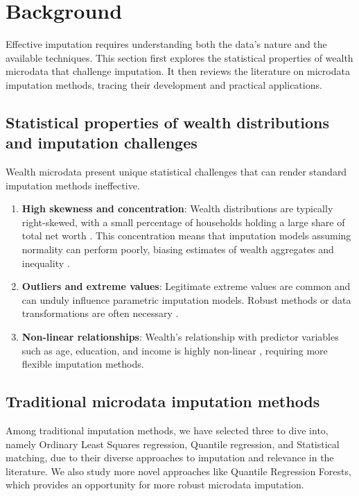\section{Background}

Effective imputation requires understanding both the data's nature and the available techniques. This section first explores the statistical properties of wealth microdata that challenge imputation. It then reviews the literature on microdata imputation methods, tracing their development and practical applications.

\subsection{Statistical properties of wealth distributions and imputation challenges}

Wealth microdata present unique statistical challenges that can render standard imputation methods ineffective.

\begin{enumerate}
    \item \textbf{High skewness and concentration}: Wealth distributions are typically right-skewed, with a small percentage of households holding a large share of total net worth \citep{chen2020imputation}. This concentration means that imputation models assuming normality can perform poorly, biasing estimates of wealth aggregates and inequality \citep{lun2019multiple}.
    \item \textbf{Outliers and extreme values}: Legitimate extreme values are common and can unduly influence parametric imputation models. Robust methods or data transformations are often necessary \citep{chen2020imputation}. 
    \item \textbf{Non-linear relationships}: Wealth's relationship with predictor variables such as age, education, and income is highly non-linear \citep{zillow2024quantile}, requiring more flexible imputation methods.
\end{enumerate}

\subsection{Traditional microdata imputation methods}

Among traditional imputation methods, we have selected three to dive into, namely Ordinary Least Squares regression, Quantile regression, and Statistical matching, due to their diverse approaches to imputation and relevance in the literature. We also study more novel approaches like Quantile Regression Forests, which provides an opportunity for more robust microdata imputation.

